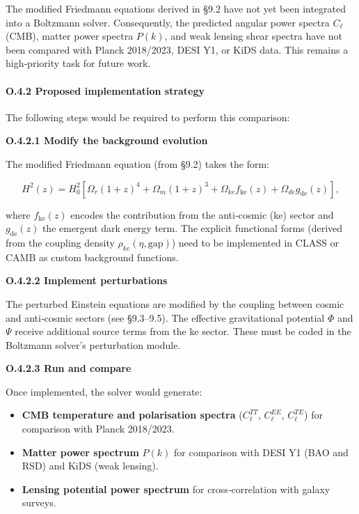\documentclass[11pt]{article}
\providecommand{\tightlist}{\setlength{\itemsep}{2pt}\setlength{\parskip}{6pt}}
\providecommand{\tightlist}{%
  \setlength{\itemsep}{2pt}\setlength{\parskip}{6pt}
}
\begin{document}
The modified Friedmann equations derived in §9.2 have not yet been
integrated into a Boltzmann solver. Consequently, the predicted angular
power spectra \(C_\ell\) (CMB), matter power spectra \(P(k)\), and weak
lensing shear spectra have not been compared with Planck 2018/2023, DESI
Y1, or KiDS data. This remains a high‑priority task for future work.

\hypertarget{o.4.2-proposed-implementation-strategy}{%
\paragraph{O.4.2 Proposed implementation
strategy}\label{o.4.2-proposed-implementation-strategy}}

The following steps would be required to perform this comparison:

\textbf{O.4.2.1 Modify the background evolution}

The modified Friedmann equation (from §9.2) takes the form:

\[
H^2(z) = H_0^2 \left[ \Omega_r (1+z)^4 + \Omega_m (1+z)^3 + \Omega_{ke} f_{\text{ke}}(z) + \Omega_{de} g_{\text{de}}(z) \right],
\]

where \(f_{\text{ke}}(z)\) encodes the contribution from the anti‑cosmic
(ke) sector and \(g_{\text{de}}(z)\) the emergent dark energy term. The
explicit functional forms (derived from the coupling density
\(\rho_{ke}(\eta, \text{gap})\)) need to be implemented in CLASS or CAMB
as custom background functions.

\textbf{O.4.2.2 Implement perturbations}

The perturbed Einstein equations are modified by the coupling between
cosmic and anti‑cosmic sectors (see §9.3--9.5). The effective
gravitational potential \(\Phi\) and \(\Psi\) receive additional source
terms from the ke sector. These must be coded in the Boltzmann solver's
perturbation module.

\textbf{O.4.2.3 Run and compare}

Once implemented, the solver would generate:

\begin{itemize}
\tightlist
\item
  \textbf{CMB temperature and polarisation spectra} (\(C_\ell^{TT}\),
  \(C_\ell^{EE}\), \(C_\ell^{TE}\)) for comparison with Planck
  2018/2023.
\item
  \textbf{Matter power spectrum} \(P(k)\) for comparison with DESI Y1
  (BAO and RSD) and KiDS (weak lensing).
\item
  \textbf{Lensing potential power spectrum} for cross‑correlation with
  galaxy surveys.
\end{itemize}
\end{document}
